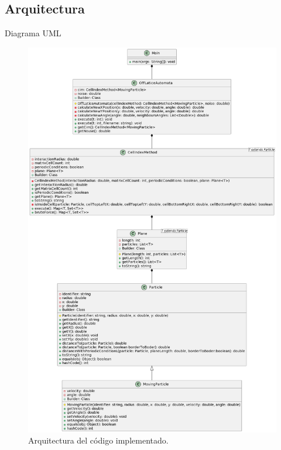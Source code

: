 \documentclass{beamer}
\begin{document}
    \subsection{Arquitectura}
    \begin{frame}{Diagrama UML}
        \begin{figure}[htbp]
            \centering
            \includegraphics[height=0.69\textheight]{./architecture}
            \caption{Arquitectura del código implementado.}
            \label{fig:architecture}
        \end{figure}
    \end{frame}
\end{document}
